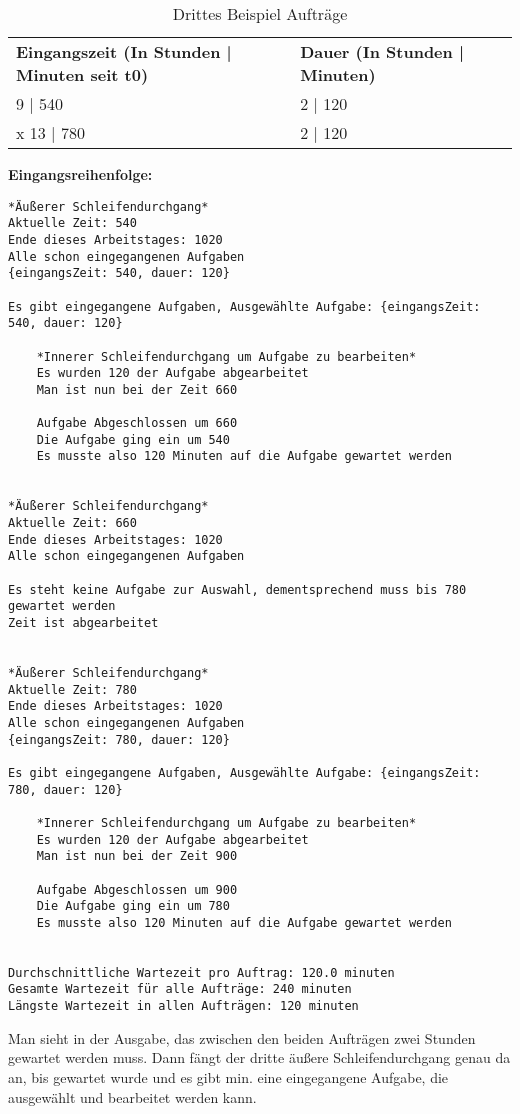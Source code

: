 \documentclass[a4paper,10pt,ngerman]{scrartcl}
\begin{document}
\begin{table}[htb]
    \centering
    \begin{tabular}{lll}
    \textbf{Eingangszeit (In Stunden | Minuten seit t0)} & \textbf{Dauer (In Stunden | Minuten)} \\
    9 | 540 & 2 | 120 \\
x    13 | 780 & 2 | 120 \\
    \end{tabular}
    \caption{Drittes Beispiel Aufträge}
    \label{tab:Table1}
 \end{table}

\textbf{Eingangsreihenfolge:}
\begin{lstlisting}[numbers=none]
*Äußerer Schleifendurchgang*
Aktuelle Zeit: 540
Ende dieses Arbeitstages: 1020
Alle schon eingegangenen Aufgaben
{eingangsZeit: 540, dauer: 120}

Es gibt eingegangene Aufgaben, Ausgewählte Aufgabe: {eingangsZeit: 540, dauer: 120}

    *Innerer Schleifendurchgang um Aufgabe zu bearbeiten*
    Es wurden 120 der Aufgabe abgearbeitet
    Man ist nun bei der Zeit 660

    Aufgabe Abgeschlossen um 660
    Die Aufgabe ging ein um 540
    Es musste also 120 Minuten auf die Aufgabe gewartet werden


*Äußerer Schleifendurchgang*
Aktuelle Zeit: 660
Ende dieses Arbeitstages: 1020
Alle schon eingegangenen Aufgaben

Es steht keine Aufgabe zur Auswahl, dementsprechend muss bis 780 gewartet werden
Zeit ist abgearbeitet


*Äußerer Schleifendurchgang*
Aktuelle Zeit: 780
Ende dieses Arbeitstages: 1020
Alle schon eingegangenen Aufgaben
{eingangsZeit: 780, dauer: 120}

Es gibt eingegangene Aufgaben, Ausgewählte Aufgabe: {eingangsZeit: 780, dauer: 120}

    *Innerer Schleifendurchgang um Aufgabe zu bearbeiten*
    Es wurden 120 der Aufgabe abgearbeitet
    Man ist nun bei der Zeit 900

    Aufgabe Abgeschlossen um 900
    Die Aufgabe ging ein um 780
    Es musste also 120 Minuten auf die Aufgabe gewartet werden


Durchschnittliche Wartezeit pro Auftrag: 120.0 minuten
Gesamte Wartezeit für alle Aufträge: 240 minuten
Längste Wartezeit in allen Aufträgen: 120 minuten
\end{lstlisting}

Man sieht in der Ausgabe, das zwischen den beiden Aufträgen zwei Stunden gewartet werden muss. 
Dann fängt der dritte äußere Schleifendurchgang genau da an, bis gewartet wurde
und es gibt min. eine eingegangene Aufgabe, die ausgewählt und bearbeitet werden kann.
\end{document}
